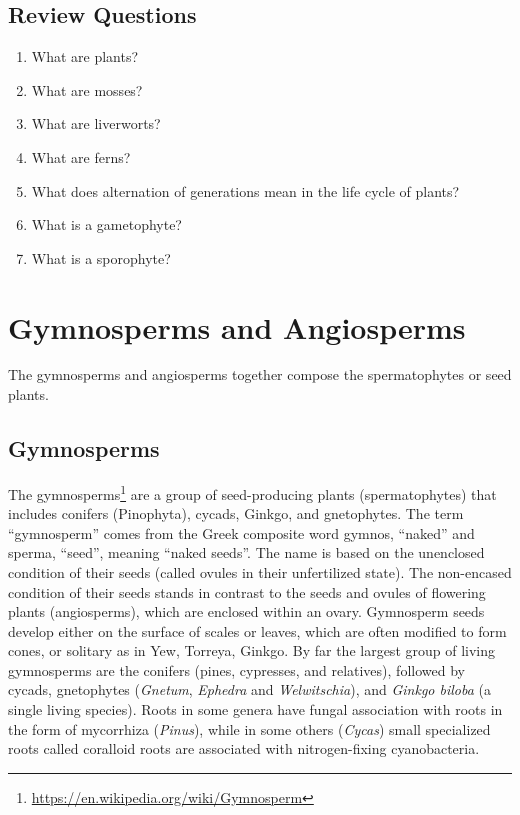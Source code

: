 \documentclass[]{book}
\providecommand{\tightlist}{%
  \setlength{\itemsep}{0pt}\setlength{\parskip}{0pt}}
\let\rmarkdownfootnote\footnote%
\def\footnote{\protect\rmarkdownfootnote}
\renewcommand{\href}[2]{#2\footnote{\url{#1}}}
\begin{document}
\hypertarget{review-questions-1}{%
\section{Review Questions}\label{review-questions-1}}

\begin{enumerate}
\def\labelenumi{\arabic{enumi}.}
\tightlist
\item
  What are plants?
\item
  What are mosses?
\item
  What are liverworts?
\item
  What are ferns?
\item
  What does alternation of generations mean in the life cycle of plants?
\item
  What is a gametophyte?
\item
  What is a sporophyte?
\end{enumerate}

\hypertarget{gymnosperms-and-angiosperms}{%
\chapter{Gymnosperms and Angiosperms}\label{gymnosperms-and-angiosperms}}

The gymnosperms and angiosperms together compose the spermatophytes or seed plants.

\hypertarget{gymnosperms}{%
\section{Gymnosperms}\label{gymnosperms}}

The \href{https://en.wikipedia.org/wiki/Gymnosperm}{gymnosperms} are a group of seed-producing plants (spermatophytes) that includes conifers (Pinophyta), cycads, Ginkgo, and gnetophytes. The term ``gymnosperm'' comes from the Greek composite word gymnos, ``naked'' and sperma, ``seed'', meaning ``naked seeds''. The name is based on the unenclosed condition of their seeds (called ovules in their unfertilized state). The non-encased condition of their seeds stands in contrast to the seeds and ovules of flowering plants (angiosperms), which are enclosed within an ovary. Gymnosperm seeds develop either on the surface of scales or leaves, which are often modified to form cones, or solitary as in Yew, Torreya, Ginkgo. By far the largest group of living gymnosperms are the conifers (pines, cypresses, and relatives), followed by cycads, gnetophytes (\emph{Gnetum}, \emph{Ephedra} and \emph{Welwitschia}), and \emph{Ginkgo biloba} (a single living species). Roots in some genera have fungal association with roots in the form of mycorrhiza (\emph{Pinus}), while in some others (\emph{Cycas}) small specialized roots called coralloid roots are associated with nitrogen-fixing cyanobacteria.
\end{document}
